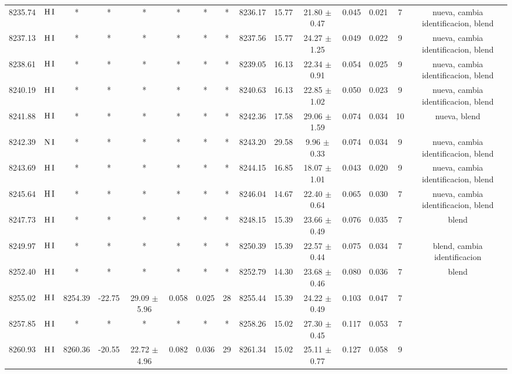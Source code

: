 \documentclass{article}
\begin{document}
\begin{table*}
\begin{adjustbox}{width=\textwidth}
\begin{tabular}{ccccccccccccccc}
8235.74 & $\mbox{H}\thinspace \mbox{I}$ & * & * & * & * & * & * & 8236.17 & 15.77 & 21.80 $\pm$ 0.47 & 0.045 & 0.021 & 7 &  nueva, cambia identificacion, blend \\
8237.13 & $\mbox{H}\thinspace \mbox{I}$ & * & * & * & * & * & * & 8237.56 & 15.77 & 24.27 $\pm$ 1.25 & 0.049 & 0.022 & 9 &  nueva, cambia identificacion, blend \\
8238.61 & $\mbox{H}\thinspace \mbox{I}$ & * & * & * & * & * & * & 8239.05 & 16.13 & 22.34 $\pm$ 0.91 & 0.054 & 0.025 & 9 &  nueva, cambia identificacion, blend \\
8240.19 & $\mbox{H}\thinspace \mbox{I}$ & * & * & * & * & * & * & 8240.63 & 16.13 & 22.85 $\pm$ 1.02 & 0.050 & 0.023 & 9 &  nueva, cambia identificacion, blend \\
8241.88 & $\mbox{H}\thinspace \mbox{I}$ & * & * & * & * & * & * & 8242.36 & 17.58 & 29.06 $\pm$ 1.59 & 0.074 & 0.034 & 10 &  nueva, blend \\
8242.39 & $\mbox{N}\thinspace \mbox{I}$ & * & * & * & * & * & * & 8243.20 & 29.58 & 9.96 $\pm$ 0.33 & 0.074 & 0.034 & 9 &  nueva, cambia identificacion, blend \\
8243.69 & $\mbox{H}\thinspace \mbox{I}$ & * & * & * & * & * & * & 8244.15 & 16.85 & 18.07 $\pm$ 1.01 & 0.043 & 0.020 & 9 &  nueva, cambia identificacion, blend \\
8245.64 & $\mbox{H}\thinspace \mbox{I}$ & * & * & * & * & * & * & 8246.04 & 14.67 & 22.40 $\pm$ 0.64 & 0.065 & 0.030 & 7 &  nueva, cambia identificacion, blend \\
8247.73 & $\mbox{H}\thinspace \mbox{I}$ & * & * & * & * & * & * & 8248.15 & 15.39 & 23.66 $\pm$ 0.49 & 0.076 & 0.035 & 7 &  blend \\
8249.97 & $\mbox{H}\thinspace \mbox{I}$ & * & * & * & * & * & * & 8250.39 & 15.39 & 22.57 $\pm$ 0.44 & 0.075 & 0.034 & 7 &  blend, cambia identificacion \\
8252.40 & $\mbox{H}\thinspace \mbox{I}$ & * & * & * & * & * & * & 8252.79 & 14.30 & 23.68 $\pm$ 0.46 & 0.080 & 0.036 & 7 &  blend \\
8255.02 & $\mbox{H}\thinspace \mbox{I}$ & 8254.39 & -22.75 & 29.09 $\pm$ 5.96 & 0.058 & 0.025 & 28 & 8255.44 & 15.39 & 24.22 $\pm$ 0.49 & 0.103 & 0.047 & 7 &  \\
8257.85 & $\mbox{H}\thinspace \mbox{I}$ & * & * & * & * & * & * & 8258.26 & 15.02 & 27.30 $\pm$ 0.45 & 0.117 & 0.053 & 7 &  \\
8260.93 & $\mbox{H}\thinspace \mbox{I}$ & 8260.36 & -20.55 & 22.72 $\pm$ 4.96 & 0.082 & 0.036 & 29 & 8261.34 & 15.02 & 25.11 $\pm$ 0.77 & 0.127 & 0.058 & 9 &  \\

\end{tabular}
\end{adjustbox}
\end{table*}
\end{document}
